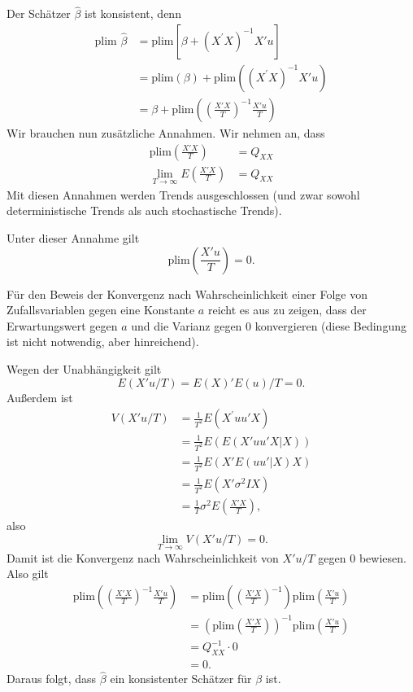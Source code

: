 \documentclass{article}
\begin{document}
Der Schätzer $\hat\beta$ ist konsistent, denn
\begin{align*}
\textrm{plim }\hat\beta &=\textrm{plim}\left[ \beta +\left( X^{\prime}X\right) ^{-1}X'u\right] \\
&=\textrm{plim}\left( \beta \right) +\textrm{plim}\left( \left( X^{\prime}X\right) ^{-1}X'u\right) \\
&=\beta +\textrm{plim}\left( \left( \frac{X'X}{T}\right) ^{-1}\frac{X'u}{T}\right)
\end{align*}
Wir brauchen nun zusätzliche Annahmen. Wir nehmen an, dass
\begin{align*}
\textrm{plim}\left( \frac{X'X}{T}\right) &=Q_{XX} \\
\lim_{T\rightarrow \infty }E\left( \frac{X'X}{T}\right) &=Q_{XX}
\end{align*}
Mit diesen Annahmen werden Trends ausgeschlossen (und zwar sowohl
deterministische Trends als auch stochastische Trends).

Unter dieser Annahme gilt
\[ \textrm{plim}\left(\frac{X'u}{T}\right) =0. \]

Für den Beweis der Konvergenz nach Wahrscheinlichkeit einer 
Folge von Zufallsvariablen gegen eine Konstante $a$ reicht es aus
zu zeigen, dass der Erwartungswert gegen $a$ und die Varianz
gegen 0 konvergieren (diese Bedingung ist nicht notwendig,
aber hinreichend).

Wegen der Unabhängigkeit gilt
\[ E(X'u/T) =E(X)'E(u) /T=0. \]
Außerdem ist
\begin{align*}
V\left( X'u/T\right) &=\frac{1}{T^{2}}E\left( X^{\prime}u u'X\right) \\
&=\frac{1}{T^{2}}E\left( E\left( X'u{}u'X|X\right) \right)\\
&=\frac{1}{T^{2}}E\left( X'E\left( u{}u'|X\right) X\right)\\
&=\frac{1}{T^{2}}E\left( X'\sigma ^{2}IX\right) \\
&=\frac{1}{T}\sigma ^{2}E\left( \frac{X'X}{T}\right) ,
\end{align*}
also
\[ \lim_{T\rightarrow \infty }V\left( X'u/T\right) =0. \]
Damit ist die Konvergenz nach Wahrscheinlichkeit von $X'u/T$ gegen
0 bewiesen. Also gilt
\begin{align*}
\textrm{plim}\left( \left( \frac{X'X}{T}\right) ^{-1}\frac{X'u}{T}\right) 
&=\textrm{plim}\left( \left( \frac{X'X}{T}\right) ^{-1}\right) \textrm{plim}\left( \frac{X'u}{T}\right) \\
&=\left( \textrm{plim}\left( \frac{X'X}{T}\right) \right) ^{-1}\textrm{plim}\left( \frac{X'u}{T}\right) \\
&=Q_{XX}^{-1}\cdot 0 \\
&=0.
\end{align*}
Daraus folgt, dass $\hat\beta$ ein konsistenter Schätzer für $\beta$ ist.
\end{document}
